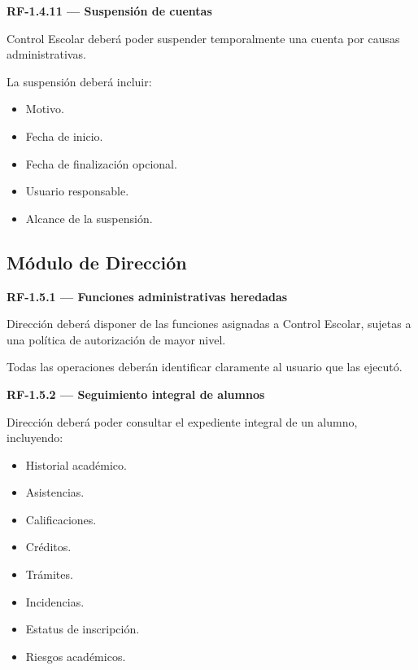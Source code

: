 \documentclass[12pt,a4paper]{article}
\newcommand{\RF}[1]{\textbf{\color{primary}RF-#1}}
\newenvironment{requisito}[1]
{
\begin{center}
\begin{minipage}{0.96\textwidth}
\colorbox{requirement}{
\begin{minipage}{0.94\textwidth}
\textbf{#1}
\end{minipage}
}
\vspace{2mm}
}
{
\end{minipage}
\end{center}
}
\begin{document}
\begin{requisito}{\RF{1.4.11} --- Suspensión de cuentas}
Control Escolar deberá poder suspender temporalmente una cuenta por causas
administrativas.

La suspensión deberá incluir:

\begin{itemize}[leftmargin=*]
\item Motivo.
\item Fecha de inicio.
\item Fecha de finalización opcional.
\item Usuario responsable.
\item Alcance de la suspensión.
\end{itemize}
\end{requisito}

\subsection{Módulo de Dirección}

\begin{requisito}{\RF{1.5.1} --- Funciones administrativas heredadas}
Dirección deberá disponer de las funciones asignadas a Control Escolar, sujetas
a una política de autorización de mayor nivel.

Todas las operaciones deberán identificar claramente al usuario que las ejecutó.
\end{requisito}

\begin{requisito}{\RF{1.5.2} --- Seguimiento integral de alumnos}
Dirección deberá poder consultar el expediente integral de un alumno,
incluyendo:

\begin{itemize}[leftmargin=*]
\item Historial académico.
\item Asistencias.
\item Calificaciones.
\item Créditos.
\item Trámites.
\item Incidencias.
\item Estatus de inscripción.
\item Riesgos académicos.
\end{itemize}
\end{requisito}
\end{document}

